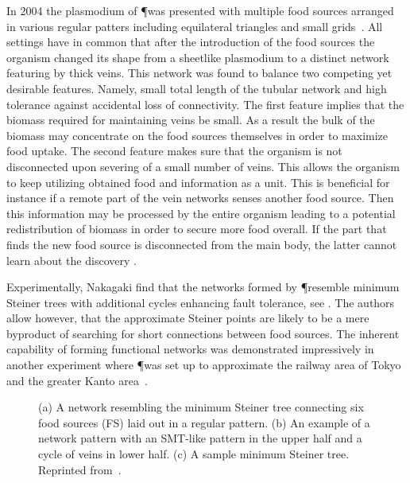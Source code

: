 			In 2004 the plasmodium of \P was presented with multiple food sources arranged in various regular patters including equilateral triangles and small grids~\cite{Nakagaki20041,nakagaki2004obtaining}. All settings have in common that after the introduction of the food sources the organism changed its shape from a sheetlike plasmodium to a distinct network featuring by thick veins. This network was found to balance two competing yet desirable features. Namely, small total length of the tubular network and high tolerance against accidental loss of connectivity. The first feature implies that the biomass required for maintaining veins be small. As a result the bulk of the biomass may concentrate on the food sources themselves in order to maximize food uptake. The second feature makes sure that the organism is not disconnected upon severing of a small number of veins. This allows the organism to keep utilizing obtained food and information as a unit. This is beneficial for instance if a remote part of the vein networks senses another food source. Then this information may be processed by the entire organism leading to a potential redistribution of biomass in order to secure more food overall. If the part that finds the new food source is disconnected from the main body, the latter cannot learn about the discovery .

			Experimentally, Nakagaki \etal find that the networks formed by \P resemble minimum Steiner trees with additional cycles enhancing fault tolerance, see . The authors allow however, that the approximate Steiner points are likely to be a mere byproduct of searching for short connections between food sources. The inherent capability of forming functional networks was demonstrated impressively in another experiment where \P was set up to approximate the railway area of Tokyo and the greater Kanto area~\cite{tero2010rules}.

			\begin{figure}
				\centering
				\caption[Network of food sources by \P]{ (a) A network resembling the minimum Steiner tree connecting six food sources (FS) laid out in a regular pattern. (b) An example of a network pattern with an SMT-like pattern in the upper half and a cycle of veins in lower half. (c) A sample minimum Steiner tree. Reprinted from~\cite{nakagaki2004obtaining}.}
				\label{fig:steiner_tree_experiment}
			\end{figure}

